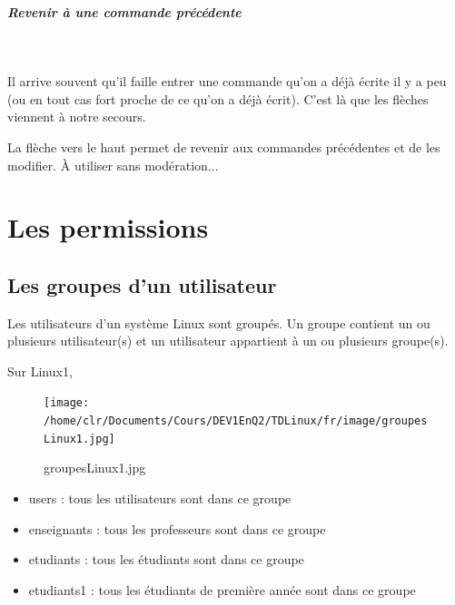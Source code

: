 \documentclass[11pt,a4paper]{article}
\begin{document}
			
		\subparagraph{Revenir \`a une commande pr\'ec\'edente} 
		
					\textcolor{white}{.} \par
				
            \par
          
          Il arrive souvent qu'il faille entrer une commande qu'on a d\'ej\`a \'ecrite il y a peu (ou en tout cas fort proche de ce qu'on a d\'ej\`a \'ecrit). 
          C'est l\`a que les fl\`eches viennent \`a notre secours.  
        
            \par
          
          La fl\`eche vers le haut permet de revenir aux commandes pr\'ec\'edentes et de les modifier. \`A utiliser sans mod\'eration...  
        
            \par
        \section{Les permissions}\subsection{Les groupes d'un utilisateur}
					Les utilisateurs d'un syst\`eme Linux sont group\'es. 
					Un groupe contient un ou plusieurs utilisateur(s) et un utilisateur appartient \`a un ou plusieurs groupe(s).
				
            \par
        
				  Sur Linux1, 
        
            \par
        \begin{figure}[hbt]
				    \begin{center}
					\texttt{[image: /home/clr/Documents/Cours/DEV1EnQ2/TDLinux/fr/image/groupesLinux1.jpg]}
						\end{center}
                
                    \caption[groupesLinux1.jpg]{groupesLinux1.jpg}
                \end{figure}
                    
            \par
        
					\begin{itemize}
				
			\item users : tous les utilisateurs sont dans ce groupe
			\item enseignants : tous les professeurs sont dans ce groupe
			\item etudiants : tous les \'etudiants sont dans ce groupe
			\item etudiants1 : tous les \'etudiants de premi\`ere ann\'ee sont dans ce groupe
					\end{itemize}
				
\end{document}
